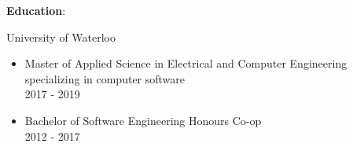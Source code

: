 \documentclass[letterpaper]{article}
\begin{document}
\begin{large}
\textbf{Education}:\\
\end{large}
University of Waterloo
\begin{itemize}[leftmargin=5.5mm]
\item Master of Applied Science in Electrical and Computer Engineering specializing in computer software \\
2017 - 2019
\item Bachelor of Software Engineering Honours Co-op\\
2012 - 2017
\end{itemize}
\end{document}
